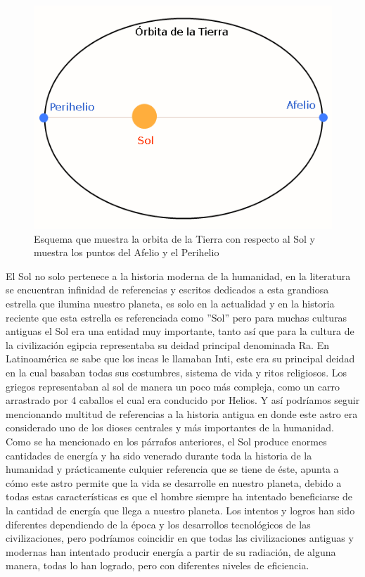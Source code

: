 \begin{figure}[h!]
        \centering
        \includegraphics[scale=0.5]{images/afelioPerihelio}
        \caption{ Esquema que muestra la orbita de la Tierra con respecto al Sol y muestra los puntos del Afelio y el Perihelio}
\end{figure}

El Sol no solo pertenece a la historia moderna de la humanidad, en la literatura se encuentran infinidad de referencias y escritos dedicados a esta grandiosa estrella que ilumina nuestro planeta, es solo en la actualidad y en la historia reciente que esta estrella es referenciada como ''Sol'' pero para muchas culturas antiguas el Sol era una entidad muy importante, tanto así que para la cultura de la civilización egipcia representaba su deidad principal denominada Ra. En Latinoamérica se sabe que los incas le llamaban Inti, este era su principal deidad en la cual basaban todas sus costumbres, sistema de vida y ritos religiosos. Los griegos representaban al sol de manera un poco más compleja, como un carro arrastrado por 4 caballos el cual era conducido por Helios. Y así podríamos seguir mencionando multitud de referencias a la historia antigua en donde este astro era considerado uno de los dioses centrales y más importantes de la humanidad.\\ 

Como se ha mencionado en los párrafos anteriores, el Sol produce enormes cantidades de energía y ha sido venerado durante toda la historia de la humanidad y prácticamente culquier referencia que se tiene de éste, apunta a cómo este astro permite que la vida se desarrolle en nuestro planeta, debido a todas estas características es que el hombre siempre ha intentado beneficiarse de la cantidad de energía que llega a nuestro planeta. Los intentos y logros han sido diferentes dependiendo de la época y los desarrollos tecnológicos de las civilizaciones, pero podríamos coincidir en que todas las civilizaciones antiguas y modernas han intentado producir energía a partir de su radiación, de alguna manera, todas lo han logrado, pero con diferentes niveles de eficiencia.\\

